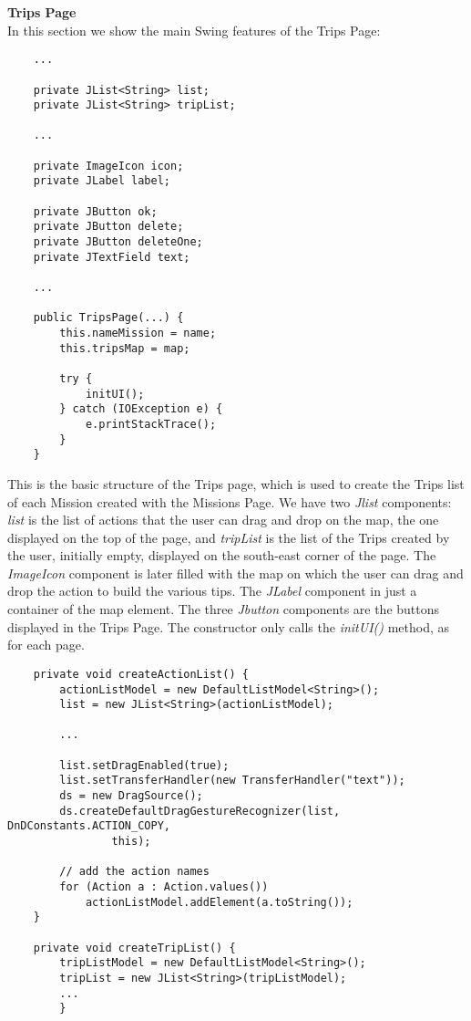 \textbf{Trips Page}
\\

In this section we show the main Swing features of the Trips Page:

\begin{lstlisting}
	...
    
	private JList<String> list;
	private JList<String> tripList;

	...

	private ImageIcon icon;
	private JLabel label;
    
	private JButton ok;
	private JButton delete;
	private JButton deleteOne;
	private JTextField text;
    
	...

	public TripsPage(...) {
		this.nameMission = name;
		this.tripsMap = map;

		try {
			initUI();
		} catch (IOException e) {
			e.printStackTrace();
		}
	}
\end{lstlisting}

This is the basic structure of the Trips page, which is used to create the Trips list of each Mission created with the Missions Page.
We have two \textit{Jlist} components: \textit{list} is the list of actions that the user can drag and drop on the map, the one displayed on the top of the page, and \textit{tripList} is the list of the Trips created by the user, initially empty, displayed on the south-east corner of the page.
The \textit{ImageIcon} component is later filled with the map on which the user can drag and drop the action to build the various tips.
The \textit{JLabel} component in just a container of the map element.
The three \textit{Jbutton} components are the buttons displayed in the Trips Page.
The constructor only calls the \textit{initUI()} method, as for each page.

\begin{lstlisting}
	private void createActionList() {
		actionListModel = new DefaultListModel<String>();
		list = new JList<String>(actionListModel);
        
        ...

		list.setDragEnabled(true);
		list.setTransferHandler(new TransferHandler("text"));
		ds = new DragSource();
		ds.createDefaultDragGestureRecognizer(list, DnDConstants.ACTION_COPY,
				this);

		// add the action names
		for (Action a : Action.values())
			actionListModel.addElement(a.toString());
	}

	private void createTripList() {
		tripListModel = new DefaultListModel<String>();
		tripList = new JList<String>(tripListModel);
		...
        }
        
\end{lstlisting}

